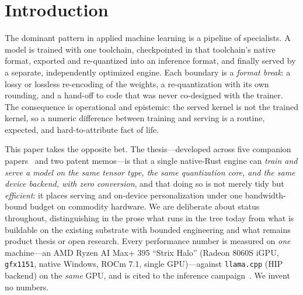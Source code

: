 \documentclass[11pt]{article}
\begin{document}
\section{Introduction}
\label{sec:intro}

The dominant pattern in applied machine learning is a pipeline of specialists. A model is trained with one toolchain, checkpointed in that toolchain's native format, exported and re-quantized into an inference format, and finally served by a separate, independently optimized engine. Each boundary is a \emph{format break}: a lossy or lossless re-encoding of the weights, a re-quantization with its own rounding, and a hand-off to code that was never co-designed with the trainer. The consequence is operational and epistemic: the served kernel is not the trained kernel, so a numeric difference between training and serving is a routine, expected, and hard-to-attribute fact of life.

This paper takes the opposite bet. The thesis---developed across five companion papers~\cite{hanzo-rocm,hanzo-train,hanzo-clp,hanzo-platform} and two patent memos---is that a single native-Rust engine can \emph{train and serve a model on the same tensor type, the same quantization core, and the same device backend, with zero conversion}, and that doing so is not merely tidy but \emph{efficient}: it places serving and on-device personalization under one bandwidth-bound budget on commodity hardware. We are deliberate about status throughout, distinguishing in the prose what runs in the tree today from what is buildable on the existing substrate with bounded engineering and what remains product thesis or open research. Every performance number is measured on \emph{one} machine---an AMD Ryzen AI Max+ 395 ``Strix Halo'' (Radeon 8060S iGPU, \texttt{gfx1151}, native Windows, ROCm 7.1, single GPU)---against \texttt{llama.cpp} (HIP backend) on the \emph{same} GPU, and is cited to the inference campaign~\cite{hanzo-rocm}. We invent no numbers.
\end{document}
